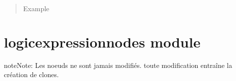 \documentclass[letterpaper,10pt,french]{sphinxmanual}
\begin{document}
\begin{fulllineitems}
\begin{fulllineitems}
\begin{quote}
\begin{description}
\item[{Example}] \leavevmode
\begin{sphinxVerbatim}[commandchars=\\\{\}]
\end{sphinxVerbatim}

\end{description}\end{quote}

\end{fulllineitems}


\end{fulllineitems}



\section{logicexpressionnodes module}
\label{\detokenize{logicexpressionnodes:module-logicexpressionnodes}}\label{\detokenize{logicexpressionnodes:logicexpressionnodes-module}}\label{\detokenize{logicexpressionnodes::doc}}\label{\detokenize{logicexpressionnodes:module-logicexpressionnodes}}
\begin{sphinxadmonition}{note}{Note:}
Les noeuds ne sont jamais modifiés. toute modification entraîne la création de clones.
\end{sphinxadmonition}
\end{document}
